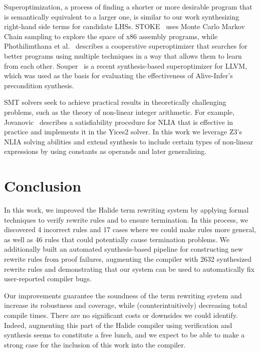 \documentclass[acmsmall,review,anonymous]{acmart}\settopmatter{printfolios=true,printccs=false,printacmref=false}
\newcommand{\NumRulesFixed}{{\color{black} 4}\xspace}
\newcommand{\NumPredicatesRelaxed}{{\color{black} 17}\xspace}
\newcommand{\NumOrderingProblems}{{\color{black} 46}\xspace}
\newcommand{\NumRulesSynthesized}{{\color{black} 2632}\xspace}
\begin{document}
Superoptimization, a process of finding a shorter or more desirable program that is semantically equivalent to a larger one, is similar to our work synthesizing right-hand side terms for candidate LHSs. STOKE~\cite{schkufza2013stochastic} uses Monte Carlo Markov Chain sampling to explore the space of x86 assembly programs, while Phothilimthana et al.~\cite{phothilimthana2016scaling} describes a cooperative superoptimizer that searches for better programs using multiple techniques in a way that allows them to learn from each other.  Souper~\cite{sasnauskas2017souper} is a recent synthesis-based superoptimizer for LLVM, which was used as the basis for evaluating the effectiveness of Alive-Infer's precondition synthesis.

SMT solvers seek to achieve practical results in theoretically challenging problems, such as the theory of non-linear integer arithmetic. For example, Jovanovic~\cite{jovanovic2017solving} describes a satisfiability procedure for NLIA that is effective in practice and implements it in the Yices2 solver. In this work we leverage Z3's NLIA solving abilities and extend synthesis to include certain types of non-linear expressions by using constants as operands and later generalizing.

\section{Conclusion}
In this work, we improved the Halide term rewriting system by applying formal
techniques to verify rewrite rules and to ensure termination.  In this process,
we discovered \NumRulesFixed incorrect rules and \NumPredicatesRelaxed cases
where we could make rules more general, as well as \NumOrderingProblems rules
that could potentially cause termination problems.  We additionally built
an automated synthesis-based pipeline for constructing new rewrite rules from
proof failures, augmenting the compiler with \NumRulesSynthesized synthesized
rewrite rules and demonstrating that our system can be used to automatically fix
user-reported compiler bugs.

Our improvements guarantee the soundness of the term rewriting system
and increase its robustness and coverage, while (counterintuitively)
decreasing total compile times. There are no significant costs or
downsides we could identify. Indeed, augmenting this part of the
Halide compiler using verification and synthesis seems to constitute a
free lunch, and we expect to be able to make a strong case for the
inclusion of this work into the compiler.
\end{document}
